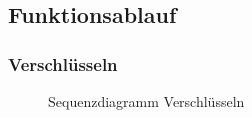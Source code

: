 \documentclass[12pt,a4paper,titlepage]{article}
\begin{document}
\subsection{Funktionsablauf}
\subsubsection{Verschlüsseln}
\begin{figure}[ht]
  \centering
  \caption{Sequenzdiagramm Verschlüsseln}
  \label{seq_diagramencrypt}
\end{figure}
\end{document}
